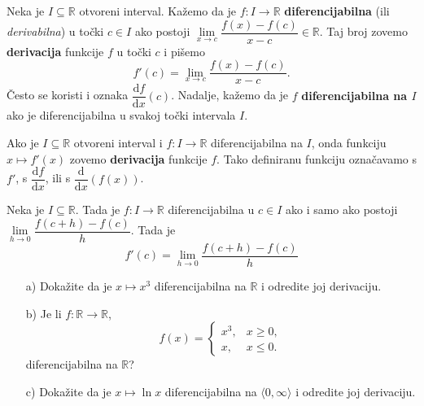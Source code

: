 \begin{definition}
Neka je $I\subseteq \mathbb{R}$ otvoreni interval. Kažemo da je $f : I\to \mathbb{R}$ \textbf{diferencijabilna} (ili \textit{derivabilna}) u točki $c\in I$ ako postoji $\lim\limits_{x\to c}{\dfrac{f(x)-f(c)}{x-c}}\in \mathbb{R}$. Taj broj zovemo \textbf{derivacija} funkcije $f$ u točki $c$ i pišemo
$$f'(c)=\lim\limits_ {x\to c}{\dfrac{f(x)-f(c)}{x-c}}.$$
Često se koristi i oznaka $\dfrac{\mathrm{d}f}{\mathrm{d}x}(c)$. Nadalje, kažemo da je $f$ \textbf{diferencijabilna na $I$} ako je diferencijabilna u svakoj točki intervala $I$.
\end{definition}
Ako je $I\subseteq \mathbb{R}$ otvoreni interval i $f : I\to \mathbb{R}$ diferencijabilna na $I$, onda funkciju $x\mapsto f'(x)$ zovemo \textbf{derivacija} funkcije $f$. Tako definiranu funkciju označavamo s $f'$, s $\dfrac{\mathrm{d}f}{\mathrm{d}x}$, ili s $\dfrac{\mathrm{d}}{\mathrm{d}x}\left(f(x)\right)$.
\begin{remark}
Neka je $I\subseteq \mathbb{R}$. Tada je $f : I\to \mathbb{R}$ diferencijabilna u $c\in I$ ako i samo ako postoji $\lim\limits_{h\to 0}{\dfrac{f(c+h)-f(c)}{h}}$. Tada je
$$f'(c)=\lim\limits_{h\to 0}{\dfrac{f(c+h)-f(c)}{h}}$$
\end{remark}
\begin{exercise} \textbf{}
\begin{itemize}
\item[a)] Dokažite da je $x\mapsto x^3$ diferencijabilna na $\mathbb{R}$ i odredite joj derivaciju.
\item[b)] Je li $f : \mathbb{R}\to \mathbb{R}$,
$$f(x)=\begin{cases}
x^3, & x\geq 0,\\
x, & x\leq 0.
\end{cases}$$
diferencijabilna na $\mathbb{R}$?
\item[c)] Dokažite da je $x\mapsto \ln{x}$ diferencijabilna na $\langle 0,\infty\rangle$ i odredite joj derivaciju.
\end{itemize}
\end{exercise}

